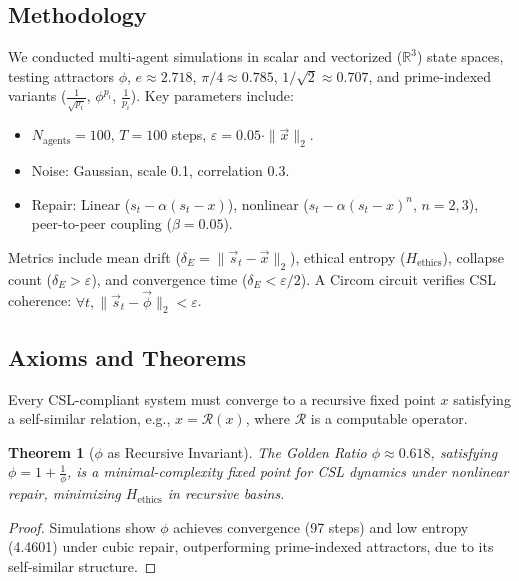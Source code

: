 \documentclass{article}
\theoremstyle{plain}
\newtheorem{theorem}{Theorem}
\begin{document}
\subsection{Methodology}
We conducted multi-agent simulations in scalar and vectorized ($\mathbb{R}^3$) state spaces, testing attractors $\phi$, $e \approx 2.718$, $\pi/4 \approx 0.785$, $1/\sqrt{2} \approx 0.707$, and prime-indexed variants ($\frac{1}{\sqrt{p_i}}$, $\phi^{p_i}$, $\frac{1}{p_i}$). Key parameters include:
\begin{itemize}
    \item $N_{\text{agents}} = 100$, $T = 100$ steps, $\varepsilon = 0.05 \cdot \|\vec{x}\|_2$.
    \item Noise: Gaussian, scale 0.1, correlation 0.3.
    \item Repair: Linear ($s_t - \alpha(s_t - x)$), nonlinear ($s_t - \alpha(s_t - x)^n$, $n=2,3$), peer-to-peer coupling ($\beta = 0.05$).
\end{itemize}

Metrics include mean drift ($\delta_E = \|\vec{s}_t - \vec{x}\|_2$), ethical entropy ($H_{\text{ethics}}$), collapse count ($\delta_E > \varepsilon$), and convergence time ($\delta_E < \varepsilon/2$). A Circom circuit verifies CSL coherence: $\forall t, \|\vec{s}_t - \vec{\phi}\|_2 < \varepsilon$.

\subsection{Axioms and Theorems}
\begin{axiom}
Every CSL-compliant system must converge to a recursive fixed point $x$ satisfying a self-similar relation, e.g., $x = \mathcal{R}(x)$, where $\mathcal{R}$ is a computable operator.
\end{axiom}

\begin{theorem}[$\phi$ as Recursive Invariant]
The Golden Ratio $\phi \approx 0.618$, satisfying $\phi = 1 + \frac{1}{\phi}$, is a minimal-complexity fixed point for CSL dynamics under nonlinear repair, minimizing $H_{\text{ethics}}$ in recursive basins.
\end{theorem}

\begin{proof}
Simulations show $\phi$ achieves convergence (97 steps) and low entropy (4.4601) under cubic repair, outperforming prime-indexed attractors, due to its self-similar structure.
\end{proof}
\end{document}
